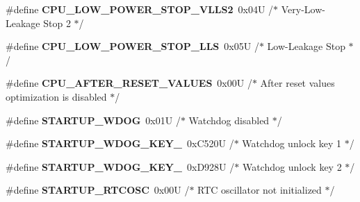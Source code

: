 \begin{DoxyCompactItemize}
\item 
\#define {\bfseries C\+P\+U\+\_\+\+L\+O\+W\+\_\+\+P\+O\+W\+E\+R\+\_\+\+S\+T\+O\+P\+\_\+\+V\+L\+L\+S2}~0x04\+U     /$\ast$ Very-\/\+Low-\/\+Leakage Stop 2 $\ast$/\hypertarget{group___c_p_u___config__module_ga6b0f8a6f777077cbebe6e6d17b37dc97}{}\label{group___c_p_u___config__module_ga6b0f8a6f777077cbebe6e6d17b37dc97}

\item 
\#define {\bfseries C\+P\+U\+\_\+\+L\+O\+W\+\_\+\+P\+O\+W\+E\+R\+\_\+\+S\+T\+O\+P\+\_\+\+L\+LS}~0x05\+U     /$\ast$ Low-\/\+Leakage Stop $\ast$/\hypertarget{group___c_p_u___config__module_gaf349a39a8fe0192778a5739efd2bd1f8}{}\label{group___c_p_u___config__module_gaf349a39a8fe0192778a5739efd2bd1f8}

\item 
\#define {\bfseries C\+P\+U\+\_\+\+A\+F\+T\+E\+R\+\_\+\+R\+E\+S\+E\+T\+\_\+\+V\+A\+L\+U\+ES}~0x00\+U     /$\ast$ After reset values optimization is disabled $\ast$/\hypertarget{group___c_p_u___config__module_ga5cfea4bca610541f33310e1837a7fe26}{}\label{group___c_p_u___config__module_ga5cfea4bca610541f33310e1837a7fe26}

\item 
\#define {\bfseries S\+T\+A\+R\+T\+U\+P\+\_\+\+W\+D\+OG}~0x01\+U     /$\ast$ Watchdog disabled $\ast$/\hypertarget{group___c_p_u___config__module_ga230d8d41c5d365878a93129b8595c199}{}\label{group___c_p_u___config__module_ga230d8d41c5d365878a93129b8595c199}

\item 
\#define {\bfseries S\+T\+A\+R\+T\+U\+P\+\_\+\+W\+D\+O\+G\+\_\+\+K\+E\+Y\+\_}~0x\+C520\+U   /$\ast$ Watchdog unlock key 1 $\ast$/\hypertarget{group___c_p_u___config__module_ga607477ca43e4216bd68a73e198cca5d9}{}\label{group___c_p_u___config__module_ga607477ca43e4216bd68a73e198cca5d9}

\item 
\#define {\bfseries S\+T\+A\+R\+T\+U\+P\+\_\+\+W\+D\+O\+G\+\_\+\+K\+E\+Y\+\_}~0x\+D928\+U   /$\ast$ Watchdog unlock key 2 $\ast$/\hypertarget{group___c_p_u___config__module_ga98be254617b09425be513de2556c5146}{}\label{group___c_p_u___config__module_ga98be254617b09425be513de2556c5146}

\item 
\#define {\bfseries S\+T\+A\+R\+T\+U\+P\+\_\+\+R\+T\+C\+O\+SC}~0x00\+U     /$\ast$ R\+T\+C oscillator not initialized $\ast$/\hypertarget{group___c_p_u___config__module_ga9d43be23473dd050ab2ebed669c2def1}{}\label{group___c_p_u___config__module_ga9d43be23473dd050ab2ebed669c2def1}


\end{DoxyCompactItemize}
